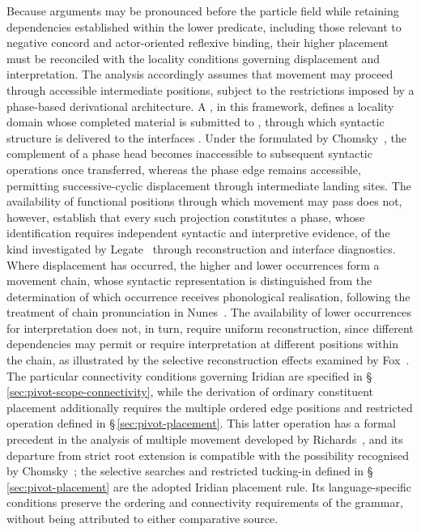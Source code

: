 Because arguments may be pronounced before the particle field while
retaining dependencies established within the lower predicate, including
those relevant to negative concord and actor-oriented reflexive binding,
their higher placement must be reconciled with the locality conditions
governing displacement and interpretation. The analysis accordingly assumes
that movement may proceed through accessible intermediate positions, subject
to the restrictions imposed by a phase-based derivational architecture. A
, in this framework, defines a locality domain whose completed
material is submitted to , through which syntactic structure
is delivered to the interfaces \cite[p.~142]{chomsky2008}. Under the
 formulated by
Chomsky~\cite[pp.~12--14]{chomsky2001}, the complement of a phase head
becomes inaccessible to subsequent syntactic operations once transferred,
whereas the phase edge remains accessible, permitting successive-cyclic
displacement through intermediate landing sites. The availability of
functional positions through which movement may pass does not, however,
establish that every such projection constitutes a phase, whose
identification requires independent syntactic and interpretive evidence, of
the kind investigated by Legate~\cite{legate2003} through reconstruction and
interface diagnostics. Where displacement has occurred, the higher and lower
occurrences form a movement chain, whose syntactic representation is
distinguished from the determination of which occurrence receives
phonological realisation, following the treatment of chain pronunciation in
Nunes~\cite{nunes2011}. The availability of lower occurrences for
interpretation does not, in turn, require uniform reconstruction, since
different dependencies may permit or require interpretation at different
positions within the chain, as illustrated by the selective reconstruction
effects examined by Fox~\cite[pp.~157--158]{fox1999}. The particular
connectivity conditions governing Iridian are specified in
§\,\ref{sec:pivot-scope-connectivity}, while the derivation of ordinary
constituent placement additionally requires the multiple ordered edge
positions and restricted  operation defined in
§\,\ref{sec:pivot-placement}. This latter operation has a formal precedent
in the analysis of multiple movement developed by
Richards~\cite[§2]{richards2002}, and its departure from strict root
extension is compatible with the possibility recognised by
Chomsky~\cite[p.~141]{chomsky2008}; the selective searches and restricted
tucking-in defined in §\,\ref{sec:pivot-placement} are the adopted Iridian
placement rule. Its language-specific conditions preserve the ordering and
connectivity requirements of the grammar, without being attributed to either
comparative source.

